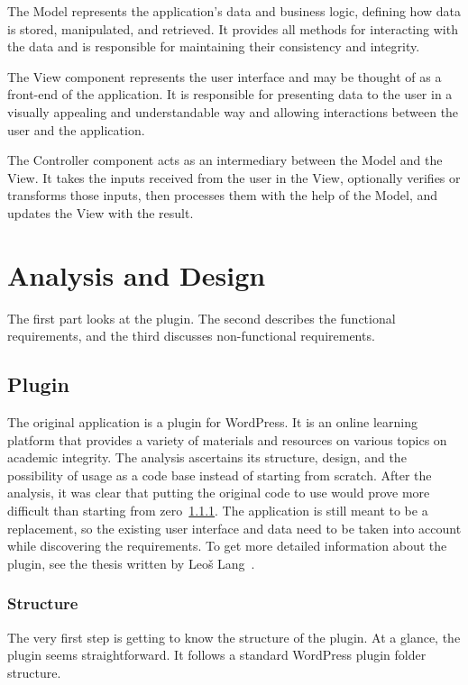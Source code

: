 \documentclass[
  digital,     %
  oneside,     %
  nosansbold,  %
  colorbold, %
  lof,         %
  lot,         %
]{fithesis4}
\begin{document}
The Model represents the application's data and business logic, defining how data is stored, manipulated, and retrieved. It provides all methods for interacting with the data and is responsible for maintaining their consistency and integrity.

The View component represents the user interface and may be thought of as a front-end of the application. It is responsible for presenting data to the user in a visually appealing and understandable way and allowing interactions between the user and the application.

The Controller component acts as an intermediary between the Model and the View. It takes the inputs received from the user in the View, optionally verifies or transforms those inputs, then processes them with the help of the Model, and updates the View with the result.

\chapter{Analysis and Design}
\label{chap:analysis}

The first part looks at the plugin. The second describes the functional requirements,
and the third discusses \mbox{non-functional} requirements.

\section{Plugin}
\label{sect:plugin}

The original application is a plugin for WordPress. It is an online learning platform that provides a variety of materials and resources on various topics on academic integrity. The analysis ascertains its structure, design, and the possibility of usage as a code base instead of starting from scratch. After the analysis, it was clear that putting the original code to use would prove more difficult than starting from zero~\ref{subsect:plugin-structure}. The application is still meant to be a replacement, so the existing user interface and data need to be taken into account while discovering the requirements. To get more detailed information about the plugin, see the thesis written by Leoš Lang~\cite{lang18}.

\subsection{Structure}
\label{subsect:plugin-structure}

The very first step is getting to know the structure of the plugin. At a glance, the plugin seems straightforward. It follows a standard WordPress plugin folder structure.
\end{document}
